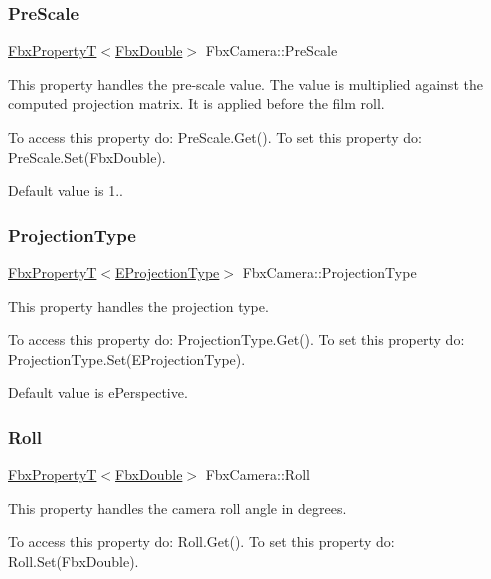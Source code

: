 \subsubsection{\texorpdfstring{Pre\+Scale}{PreScale}}
{\footnotesize\ttfamily \hyperlink{class_fbx_property_t}{Fbx\+PropertyT}$<$\hyperlink{fbxtypes_8h_a171e72a1c46fc15c1a6c9c31948c1c5b}{Fbx\+Double}$>$ Fbx\+Camera\+::\+Pre\+Scale}

This property handles the pre-\/scale value. The value is multiplied against the computed projection matrix. It is applied before the film roll.

To access this property do\+: Pre\+Scale.\+Get(). To set this property do\+: Pre\+Scale.\+Set(\+Fbx\+Double).

Default value is 1.. \mbox{\label{class_fbx_camera_a36af73c36f749f694ccc9eefbe88087b}} 
\subsubsection{\texorpdfstring{Projection\+Type}{ProjectionType}}
{\footnotesize\ttfamily \hyperlink{class_fbx_property_t}{Fbx\+PropertyT}$<$\hyperlink{class_fbx_camera_a717b9b0d28c8b20c115edf8c80016fb1}{E\+Projection\+Type}$>$ Fbx\+Camera\+::\+Projection\+Type}

This property handles the projection type.

To access this property do\+: Projection\+Type.\+Get(). To set this property do\+: Projection\+Type.\+Set(\+E\+Projection\+Type).

Default value is e\+Perspective. \mbox{\label{class_fbx_camera_ab59a181ec24cb954e0899273caea96dc}} 
\subsubsection{\texorpdfstring{Roll}{Roll}}
{\footnotesize\ttfamily \hyperlink{class_fbx_property_t}{Fbx\+PropertyT}$<$\hyperlink{fbxtypes_8h_a171e72a1c46fc15c1a6c9c31948c1c5b}{Fbx\+Double}$>$ Fbx\+Camera\+::\+Roll}

This property handles the camera roll angle in degrees.

To access this property do\+: Roll.\+Get(). To set this property do\+: Roll.\+Set(\+Fbx\+Double).

